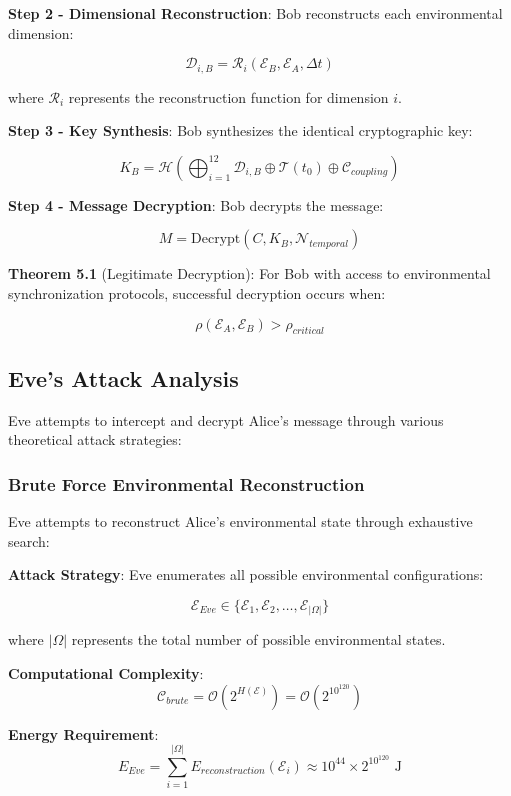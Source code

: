 \documentclass[12pt]{article}
\begin{document}
\textbf{Step 2 - Dimensional Reconstruction}: Bob reconstructs each environmental dimension:

$$\mathcal{D}_{i,B} = \mathcal{R}_i\left(\mathcal{E}_B, \mathcal{E}_A, \Delta t\right)$$

where $\mathcal{R}_i$ represents the reconstruction function for dimension $i$.

\textbf{Step 3 - Key Synthesis}: Bob synthesizes the identical cryptographic key:

$$K_B = \mathcal{H}\left(\bigoplus_{i=1}^{12} \mathcal{D}_{i,B} \oplus \mathcal{T}(t_0) \oplus \mathcal{C}_{coupling}\right)$$

\textbf{Step 4 - Message Decryption}: Bob decrypts the message:

$$M = \text{Decrypt}(C, K_B, \mathcal{N}_{temporal})$$

\textbf{Theorem 5.1} (Legitimate Decryption): For Bob with access to environmental synchronization protocols, successful decryption occurs when:

$$\rho(\mathcal{E}_A, \mathcal{E}_B) > \rho_{critical}$$

\subsection{Eve's Attack Analysis}

Eve attempts to intercept and decrypt Alice's message through various theoretical attack strategies:

\subsubsection{Brute Force Environmental Reconstruction}

Eve attempts to reconstruct Alice's environmental state through exhaustive search:

\textbf{Attack Strategy}: Eve enumerates all possible environmental configurations:

$$\mathcal{E}_{Eve} \in \{\mathcal{E}_1, \mathcal{E}_2, \ldots, \mathcal{E}_{|\Omega|}\}$$

where $|\Omega|$ represents the total number of possible environmental states.

\textbf{Computational Complexity}: 
$$\mathcal{C}_{brute} = \mathcal{O}(2^{H(\mathcal{E})}) = \mathcal{O}(2^{10^{120}})$$

\textbf{Energy Requirement}: 
$$E_{Eve} = \sum_{i=1}^{|\Omega|} E_{reconstruction}(\mathcal{E}_i) \approx 10^{44} \times 2^{10^{120}} \text{ J}$$
\end{document}
